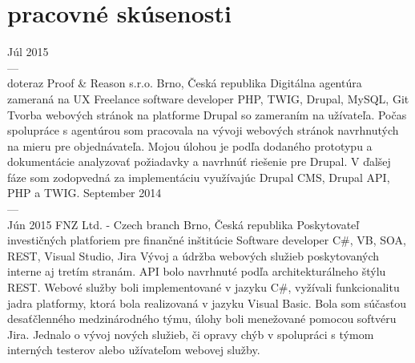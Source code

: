 \documentclass[]{friggeri-cv} %
\begin{document}
\section{pracovné skúsenosti}

\begin{entrylist}
  \job
  {Júl 2015 \\ --- \\ doteraz}
  {Proof \& Reason s.r.o.}
  {Brno, Česká republika}
  {Digitálna agentúra zameraná na UX}
  {
    \position
    {Freelance software developer}
    {PHP, TWIG, Drupal, MySQL, Git}
    {Tvorba webových stránok na platforme Drupal so zameraním na užívateľa. Počas spolupráce s agentúrou som pracovala na vývoji webových stránok navrhnutých na mieru pre objednávateľa. Mojou úlohou je podľa dodaného prototypu a dokumentácie analyzovať požiadavky a navrhnúť riešenie pre Drupal. V ďalšej fáze som zodopvedná za implementáciu využívajúc Drupal CMS, Drupal API, PHP a TWIG.}
  }
\job
{September 2014 \\ --- \\ Jún 2015}
{FNZ Ltd. - Czech branch}
{Brno, Česká republika}
{Poskytovateľ investičných platforiem pre finančné inštitúcie}
{
  \position
  {Software developer}
  {C\#, VB, SOA, REST, Visual Studio, Jira}
  {Vývoj a údržba webových služieb poskytovaných interne aj tretím stranám. API bolo navrhnuté podľa architekturálneho štýlu REST. Webové služby boli implementované v jazyku C\#, vyžívali funkcionalitu jadra platformy, ktorá bola realizovaná v jazyku Visual Basic. Bola som súčasťou desaťčlenného medzinárodného týmu, úlohy boli menežované pomocou softvéru Jira. Jednalo o vývoj nových služieb, či opravy chýb v spolupráci s týmom interných testerov alebo užívateľom webovej služby.}
}
\end{entrylist}
\end{document}
